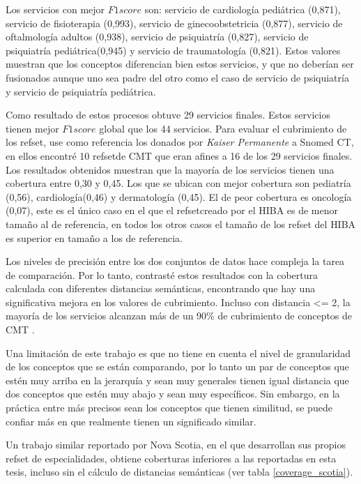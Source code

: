 Los servicios con mejor $F1 score$ son: servicio de cardiología pediátrica (0,871), servicio de fisioterapia (0,993), servicio de ginecoobstetricia (0,877), servicio de oftalmología adultos (0,938), servicio de psiquiatría (0,827), servicio de psiquiatría pediátrica(0,945) y  servicio de traumatología (0,821). Estos valores muestran que los conceptos diferencian bien estos servicios, y que no deberían ser fusionados aunque uno sea padre del otro como el caso de  servicio de psiquiatría y servicio de psiquiatría pediátrica.

Como resultado de estos procesos obtuve 29 servicios finales. Estos servicios tienen mejor $F1 score$ global que los 44 servicios. Para evaluar el cubrimiento de los {\acrshort{refset}}, use como referencia los donados por \textit{Kaiser Permanente }a Snomed CT, en ellos encontré 10 {\acrshort{refset}}de \acrshort{CMT} que eran afines a 16 de los 29 servicios finales. Los resultados obtenidos muestran que la mayoría de los servicios tienen una cobertura entre 0,30 y 0,45. Los que se ubican con mejor cobertura son pediatría (0,56), cardiología(0,46) y dermatología (0,45). El de peor cobertura es oncología (0,07), este es el único caso en el que el {\acrshort{refset}}creado por el \acrshort{HIBA} es de menor tamaño al de referencia, en todos los otros casos el tamaño de los {\acrshort{refset}} del \acrshort{HIBA} es superior en tamaño a los de referencia. 

Los niveles de precisión entre los dos conjuntos de datos hace compleja la tarea de comparación. Por lo tanto, contrasté estos resultados con la cobertura calculada con diferentes distancias semánticas, encontrando que hay una significativa mejora en los valores de cubrimiento. Incluso con distancia \textless= 2,  la mayoría de los servicios alcanzan más de un 90\% de cubrimiento de conceptos de \acrshort{CMT} .

Una limitación de este trabajo es que  no tiene en cuenta el nivel de granularidad de los conceptos que se están comparando, por lo tanto un par de conceptos que estén muy arriba en la jerarquía y sean muy generales tienen igual distancia que dos conceptos que estén muy abajo y sean muy específicos. Sin embargo, en la práctica entre más precisos sean los conceptos que tienen similitud, se puede confiar más en que realmente tienen un significado similar.

Un trabajo similar reportado por Nova Scotia\cite{nova}, en el que desarrollan sus propios {\acrshort{refset}} de especialidades, obtiene coberturas inferiores a las reportadas en esta tesis, incluso sin el cálculo de distancias semánticas (ver tabla \ref{coverage_scotia}). 

